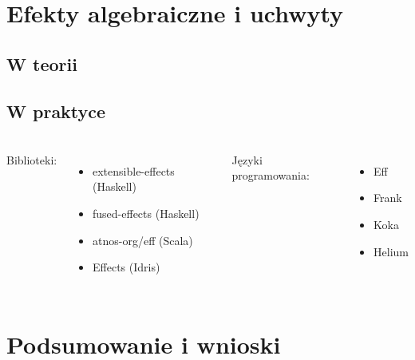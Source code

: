 \documentclass[polish, 13pt]{beamer}
\begin{document}

\section{Efekty algebraiczne i uchwyty}

\subsection{W teorii}

\subsection{W praktyce}

\begin{frame}
  \frametitle{}
  \begin{columns}
    \column{.4\paperwidth}
    Biblioteki:
    \begin{itemize}
      \item extensible-effects (Haskell)
      \item fused-effects (Haskell)
      \item atnos-org/eff (Scala)
      \item Effects (Idris)
    \end{itemize}
    \column{.4\paperwidth}
    Języki programowania:
    \begin{itemize}
      \item Eff
      \item Frank
      \item Koka
      \item Helium
    \end{itemize}
  \end{columns}
\end{frame}

\section{Podsumowanie i wnioski}
\end{document}
